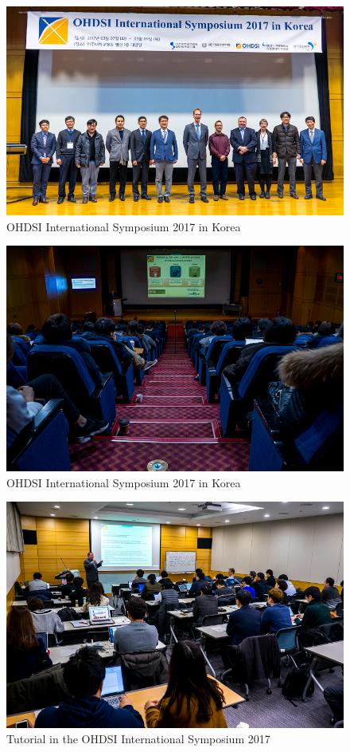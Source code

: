 \documentclass[]{book}
\begin{document}
\begin{figure}
\includegraphics[width=0.8\linewidth]{images/OhdsiCommunity/DSC01956} \caption{OHDSI International Symposium 2017 in Korea}\label{fig:OHDSIInternationalSymposium2017inKorea1}
\end{figure}
\begin{figure}
\includegraphics[width=0.8\linewidth]{images/OhdsiCommunity/DSC01861} \caption{OHDSI International Symposium 2017 in Korea}\label{fig:OHDSIInternationalSymposium2017inKorea1}
\end{figure}

\begin{figure}
\includegraphics[width=0.8\linewidth]{images/OhdsiCommunity/DSC02166} \caption{Tutorial in the OHDSI International Symposium 2017}\label{fig:OHDSIInternationalSymposium2017inKorea2}
\end{figure}
\end{document}
